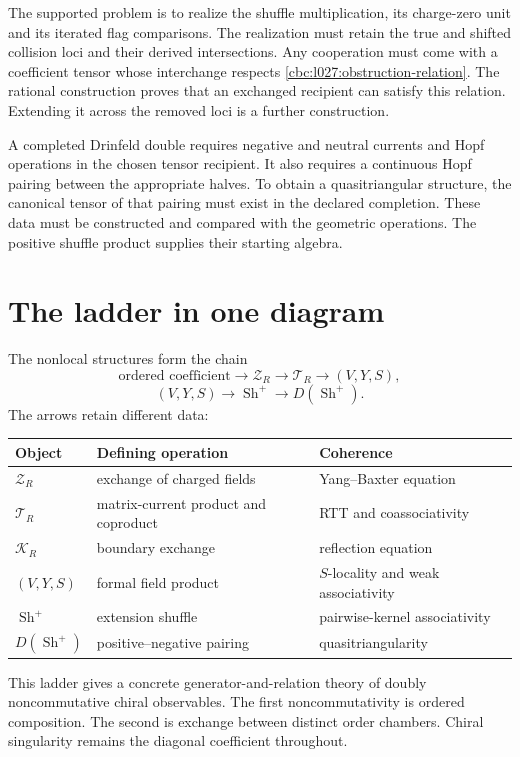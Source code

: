 The supported problem is to realize the shuffle multiplication,
its charge-zero unit and its iterated flag comparisons.
The realization must retain the true and shifted collision loci
and their derived intersections.  Any cooperation must come with a coefficient
tensor whose interchange respects
\eqref{cbc:l027:obstruction-relation}.
The rational construction proves that an exchanged recipient can
satisfy this relation.  Extending it across the removed loci is a
further construction.

A completed Drinfeld double requires negative and neutral currents
and Hopf operations in the chosen tensor recipient.
It also requires a continuous Hopf pairing between the appropriate halves.
To obtain a quasitriangular structure, the canonical tensor of
that pairing must exist in the declared completion.
These data must be constructed and compared with the geometric
operations.  The positive shuffle product supplies their starting
algebra.

\chapter{The ladder in one diagram}
The nonlocal structures form the chain
\[
\text{ordered coefficient}
\longrightarrow \mathcal Z_R
\longrightarrow \mathcal T_R
\longrightarrow (V,Y,S),
\]
\[
(V,Y,S)
\longrightarrow \operatorname{Sh}^{+}
\longrightarrow D\!\left(\operatorname{Sh}^{+}\right).
\]
The arrows retain different data:
\begin{center}
\small
\begin{tabularx}{0.96\textwidth}{@{}>{\raggedright\arraybackslash}p{}>{\raggedright\arraybackslash}X>{\raggedright\arraybackslash}p{}@{}}
\toprule
\textbf{Object}&\textbf{Defining operation}&\textbf{Coherence}\\
\midrule
$\mathcal Z_R$&exchange of charged fields&Yang--Baxter equation\\
$\mathcal T_R$&matrix-current product and coproduct&RTT and coassociativity\\
$\mathcal K_R$&boundary exchange&reflection equation\\
$(V,Y,S)$&formal field product&$S$-locality and weak associativity\\
$\operatorname{Sh}^{+}$&extension shuffle&pairwise-kernel associativity\\
$D(\operatorname{Sh}^{+})$&positive--negative pairing&quasitriangularity\\
\bottomrule
\end{tabularx}
\end{center}
This ladder gives a concrete generator-and-relation theory of doubly noncommutative chiral observables.  The first noncommutativity is ordered composition.  The second is exchange between distinct order chambers.  Chiral singularity remains the diagonal coefficient throughout.


